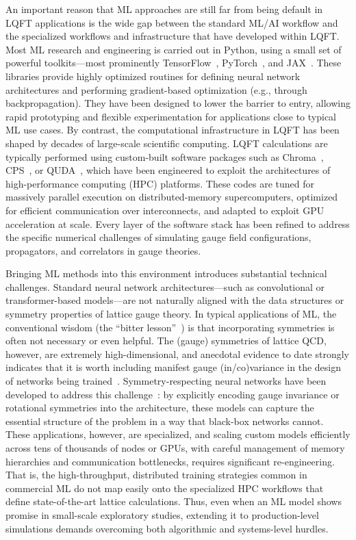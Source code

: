 \documentclass[12pt]{article}
\begin{document}
An important reason that ML approaches are still far from being default in LQFT applications is the wide gap between the standard ML/AI workflow and the specialized workflows and infrastructure that have developed within LQFT. Most ML research and engineering is carried out in Python, using a small set of powerful toolkits—most prominently TensorFlow~\cite{tensorflow2015-whitepaper}, PyTorch~\cite{paszke2019pytorchimperativestylehighperformance}, and JAX~\cite{jax2018github}. These libraries provide highly optimized routines for defining neural network architectures and performing gradient-based optimization (e.g., through backpropagation). They have been designed to lower the barrier to entry, allowing rapid prototyping and flexible experimentation for applications close to typical ML use cases. 
By contrast, the computational infrastructure in LQFT has been shaped by decades of large-scale scientific computing. LQFT calculations are typically performed using custom-built software packages such as Chroma~\cite{Edwards:2004sx}, CPS~\cite{Jung:2014ata}, or QUDA~\cite{Clark:2009wm}, which have been engineered to exploit the architectures of high-performance computing (HPC) platforms. These codes are tuned for massively parallel execution on distributed-memory supercomputers, optimized for efficient communication over interconnects, and adapted to exploit GPU acceleration at scale. Every layer of the software stack has been refined to address the specific numerical challenges of simulating gauge field configurations, propagators, and correlators in gauge theories.

Bringing ML methods into this environment introduces substantial technical challenges. Standard neural network architectures—such as convolutional or transformer-based models—are not naturally aligned with the data structures or symmetry properties of lattice gauge theory. In typical applications of ML, the conventional wisdom (the ``bitter lesson''~\cite{sutton2019bitter}) is that incorporating symmetries is often not necessary or even helpful. The (gauge) symmetries of lattice QCD, however, are extremely high-dimensional, and anecdotal evidence to date strongly indicates that it is worth including manifest gauge (in/co)variance in the design of networks being trained~\cite{Kanwar:2020xzo}.
Symmetry-respecting neural networks have been developed to address this challenge~\cite{Favoni:2020reg}: by explicitly encoding gauge invariance or rotational symmetries into the architecture, these models can capture the essential structure of the problem in a way that black-box networks cannot. These applications, however, are specialized, and scaling custom models efficiently across tens of thousands of nodes or GPUs, with careful management of memory hierarchies and communication bottlenecks, requires significant re-engineering. That is, the high-throughput, distributed training strategies common in commercial ML do not map easily onto the specialized HPC workflows that define state-of-the-art lattice calculations. Thus, even when an ML model shows promise in small-scale exploratory studies, extending it to production-level simulations demands overcoming both algorithmic and systems-level hurdles.
\end{document}
